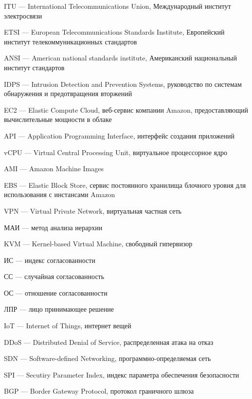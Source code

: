 \hypertarget{itu}{ITU --- International Telecommunications Union, Международный институт электросвязи}

\clearpage

\hypertarget{etsi}{ETSI --- European Telecommunications Standards Institute, Европейский институт телекоммуникационных стандартов}

\hypertarget{ansi}{ANSI --- American national standards institute, Американский национальный институт стандартов}

\hypertarget{idps}{IDPS --- Intrusion Detection and Prevention Systems, руководство по системам обнаружения и предотвращения вторжений}

\hypertarget{ec2}{EC2 --- Elastic Compute Cloud, веб-сервис компании Amazon, предоставляющий вычислительные мощности в облаке}

\hypertarget{api}{API --- Application Programming Interface, интерфейс создания приложений}

\hypertarget{vcpu}{vCPU --- Virtual Central Processing Unit, виртуальное процессорное ядро}

\hypertarget{ami}{AMI --- Amazon Machine Images}

\hypertarget{ebs}{EBS --- Elastic Block Store, сервис постоянного хранилища блочного уровня для использования с инстансами Amazon}

\hypertarget{vpn}{VPN --- Virtual Private Network, виртуальная частная сеть}

\hypertarget{mai}{МАИ --- метод анализа иерархии}

\hypertarget{kvm}{KVM --- Kernel-based Virtual Machine, свободный гипервизор}

\hypertarget{is}{ИС --- индекс согласованности}

\hypertarget{ss}{СС --- случайная согласованность}

\hypertarget{ots}{ОС --- отношение согласованности}

\hypertarget{lpr}{ЛПР --- лицо принимающее решение}

\hypertarget{iot}{IoT --- Internet of Things, интернет вещей}

\hypertarget{ddos}{DDoS --- Distributed Denial of Service, распределенная атака на отказ}

\hypertarget{sdn}{SDN --- Software-defined Networking, программно-определяемая сеть}

\hypertarget{spi}{SPI --- Secutiry Parameter Index, индекс параметра обеспечения безопасности}

\hypertarget{bgp}{BGP --- Border Gateway Protocol, протокол граничного шлюза}

